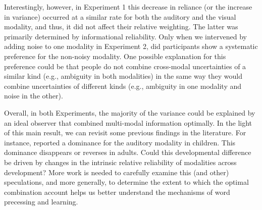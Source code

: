 \documentclass[10pt,letterpaper]{article}
\begin{document}
Interestingly, however, in Experiment 1 this decrease in reliance (or the increase in variance) occurred at a similar rate for both the auditory and the visual modality, and thus, it did not affect their relative weighting. The latter was primarily determined by informational reliability. Only when we intervened by adding  noise to one modality in Experiment 2, did participants show a systematic preference for the non-noisy modality. One possible explanation for this preference could be that people do not combine cross-modal uncertainties of a similar kind (e.g., ambiguity in both modalities) in the same way they would combine uncertainties of different kinds (e.g., ambiguity in one modality and noise in the other).

Overall, in both Experiments, the majority of the variance could be explained by an ideal observer that combined multi-modal information optimally. In the light of this main result, we can revisit some previous findings in the literature. For instance,  reported a dominance for the auditory modality in children. This dominance disappears or reverses in adults. Could this developmental difference be driven by changes in the intrinsic relative reliability of modalities across development? More work is needed to carefully examine this (and other) speculations, and more generally, to determine the extent to which the optimal combination account helps us better understand the mechanisms of word precessing and learning.



\setlength{\bibleftmargin}{.125in}
\setlength{\bibindent}{-\bibleftmargin}


\end{document}
